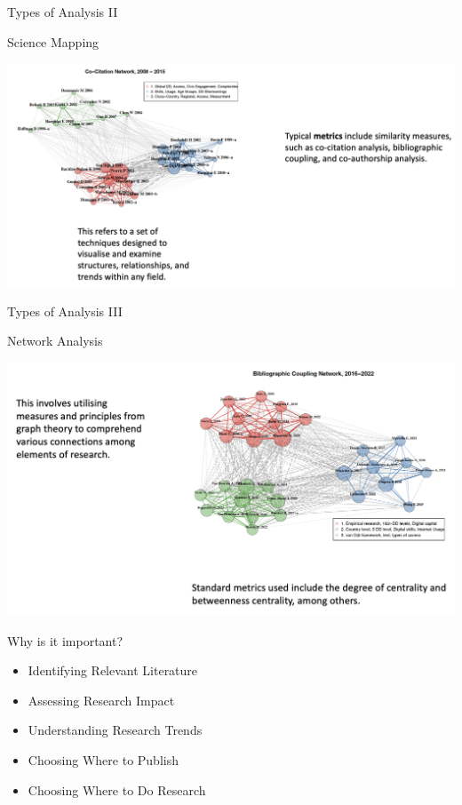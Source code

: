 \documentclass[
  ignorenonframetext,
]{beamer}
\providecommand{\tightlist}{%
  \setlength{\itemsep}{0pt}\setlength{\parskip}{0pt}}
\begin{document}
\begin{frame}{Types of Analysis II}
\protect\hypertarget{types-of-analysis-ii}{}
\begin{block}{Science Mapping}
\protect\hypertarget{science-mapping}{}
\begin{center}
\includegraphics[width=1\textwidth]{pic_2.png}
\end{center}
\end{block}
\end{frame}

\begin{frame}{Types of Analysis III}
\protect\hypertarget{types-of-analysis-iii}{}
\begin{block}{Network Analysis}
\protect\hypertarget{network-analysis}{}
\begin{center}
\includegraphics[width=1\textwidth]{pic_3.png}
\end{center}
\end{block}
\end{frame}

\begin{frame}{Why is it important?}
\protect\hypertarget{why-is-it-important}{}
\begin{itemize}
\tightlist
\item
  Identifying Relevant Literature
\item
  Assessing Research Impact
\item
  Understanding Research Trends
\item
  Choosing Where to Publish
\item
  Choosing Where to Do Research
\end{itemize}
\end{frame}
\end{document}
